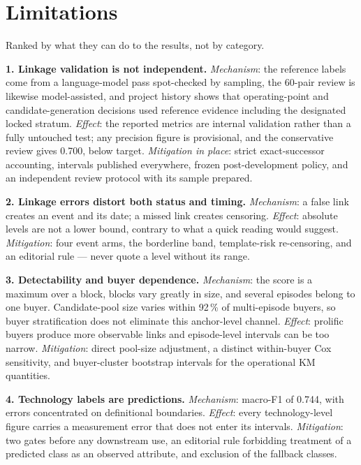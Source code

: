 \section{Limitations}

Ranked by what they can do to the results, not by category.

\textbf{1. Linkage validation is not independent.} \emph{Mechanism}: the reference labels come from a language-model pass spot-checked by sampling, the 60-pair review is likewise model-assisted, and project history shows that operating-point and candidate-generation decisions used reference evidence including the designated locked stratum. \emph{Effect}: the reported metrics are internal validation rather than a fully untouched test; any precision figure is provisional, and the conservative review gives 0.700, below target. \emph{Mitigation in place}: strict exact-successor accounting, intervals published everywhere, frozen post-development policy, and an independent review protocol with its sample prepared.

\textbf{2. Linkage errors distort both status and timing.} \emph{Mechanism}: a false link creates an event and its date; a missed link creates censoring. \emph{Effect}: absolute levels are not a lower bound, contrary to what a quick reading would suggest. \emph{Mitigation}: four event arms, the borderline band, template-risk re-censoring, and an editorial rule --- never quote a level without its range.

\textbf{3. Detectability and buyer dependence.} \emph{Mechanism}: the score is a maximum over a block, blocks vary greatly in size, and several episodes belong to one buyer. Candidate-pool size varies within 92\,\% of multi-episode buyers, so buyer stratification does not eliminate this anchor-level channel. \emph{Effect}: prolific buyers produce more observable links and episode-level intervals can be too narrow. \emph{Mitigation}: direct pool-size adjustment, a distinct within-buyer Cox sensitivity, and buyer-cluster bootstrap intervals for the operational KM quantities.

\textbf{4. Technology labels are predictions.} \emph{Mechanism}: macro-F1 of 0.744, with errors concentrated on definitional boundaries. \emph{Effect}: every technology-level figure carries a measurement error that does not enter its intervals. \emph{Mitigation}: two gates before any downstream use, an editorial rule forbidding treatment of a predicted class as an observed attribute, and exclusion of the fallback classes.

